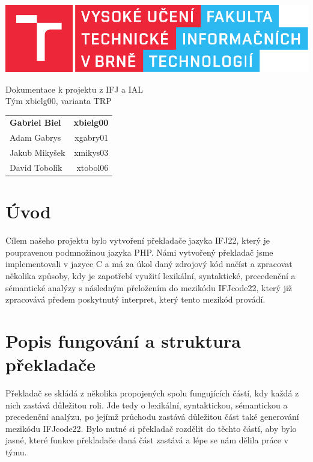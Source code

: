 \documentclass[a4paper, 12pt]{article}
\begin{document}
    \begin{titlepage}
		\centering

        \includegraphics{src/fitlogo.pdf}


        {\Huge Dokumentace k projektu z IFJ a IAL\\[0.4em]
            \LARGE Tým xbielg00, varianta TRP}


        \begin{table}[H]
            \hfill
            \begin{tabularx}{0.5\textwidth}{Xr}
                \textbf{Gabriel Biel} & \textbf{xbielg00} \\
                Adam Gabrys & xgabry01 \\
                Jakub Mikyšek & xmikys03 \\
                David Tobolík & xtobol06 \\
            \end{tabularx}
        \end{table}
	\end{titlepage}

    \tableofcontents
    \newpage

    \section{Úvod}
    Cílem našeho projektu bylo vytvoření překladače jazyka IFJ22, který je poupravenou podmnožinou jazyka PHP. Námi vytvořený překladač jsme implementovali v jazyce C a  má za úkol daný zdrojový kód načíst a zpracovat několika způsoby, kdy je zapotřebí využití lexikální, syntaktické, precedenční a sémantické analýzy s následným přeložením do mezikódu IFJcode22, který již zpracovává předem poskytnutý interpret, který tento mezikód provádí.

    \section{Popis fungování a struktura překladače}
    Překladač se skládá z několika propojených spolu fungujících částí, kdy každá z nich zastává důležitou roli. Jde tedy o lexikální, syntaktickou, sémantickou a precedenční analýzu, po jejímž průchodu zastává důležitou část také generování mezikódu IFJcode22. Bylo nutné si překladač rozdělit do těchto částí, aby bylo jasné, které funkce překladače daná část zastává a lépe se nám dělila práce v týmu.
\end{document}
